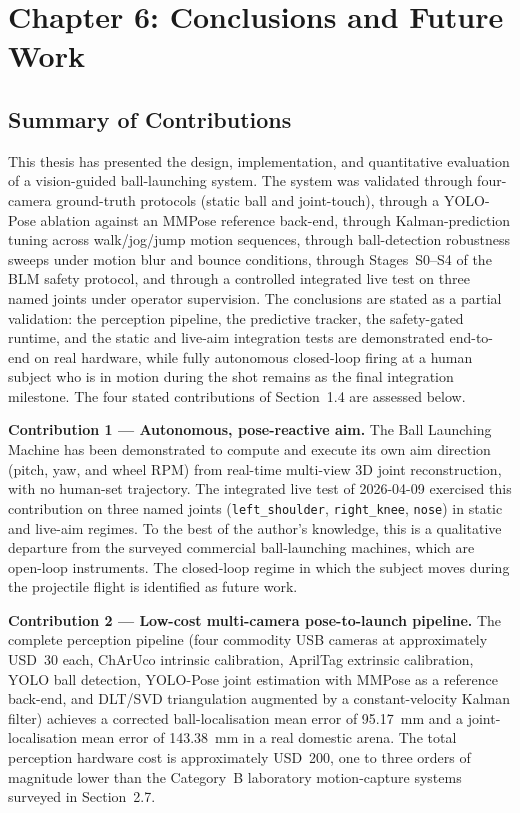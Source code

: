 \chapter{Chapter 6: Conclusions and Future Work}

\section{Summary of Contributions}

This thesis has presented the design, implementation, and quantitative evaluation of a vision-guided ball-launching system. The system was validated through four-camera ground-truth protocols (static ball and joint-touch), through a YOLO-Pose ablation against an MMPose reference back-end, through Kalman-prediction tuning across walk/jog/jump motion sequences, through ball-detection robustness sweeps under motion blur and bounce conditions, through Stages~S0--S4 of the BLM safety protocol, and through a controlled integrated live test on three named joints under operator supervision. The conclusions are stated as a partial validation: the perception pipeline, the predictive tracker, the safety-gated runtime, and the static and live-aim integration tests are demonstrated end-to-end on real hardware, while fully autonomous closed-loop firing at a human subject who is in motion during the shot remains as the final integration milestone. The four stated contributions of Section~1.4 are assessed below.

\textbf{Contribution 1 --- Autonomous, pose-reactive aim.} The Ball Launching Machine has been demonstrated to compute and execute its own aim direction (pitch, yaw, and wheel RPM) from real-time multi-view 3D joint reconstruction, with no human-set trajectory. The integrated live test of 2026-04-09 exercised this contribution on three named joints (\texttt{left\_shoulder}, \texttt{right\_knee}, \texttt{nose}) in static and live-aim regimes. To the best of the author's knowledge, this is a qualitative departure from the surveyed commercial ball-launching machines, which are open-loop instruments. The closed-loop regime in which the subject moves during the projectile flight is identified as future work.

\textbf{Contribution 2 --- Low-cost multi-camera pose-to-launch pipeline.} The complete perception pipeline (four commodity USB cameras at approximately USD~30 each, ChArUco intrinsic calibration, AprilTag extrinsic calibration, YOLO ball detection, YOLO-Pose joint estimation with MMPose as a reference back-end, and DLT/SVD triangulation augmented by a constant-velocity Kalman filter) achieves a corrected ball-localisation mean error of 95.17~mm and a joint-localisation mean error of 143.38~mm in a real domestic arena. The total perception hardware cost is approximately USD~200, one to three orders of magnitude lower than the Category~B laboratory motion-capture systems surveyed in Section~2.7.

